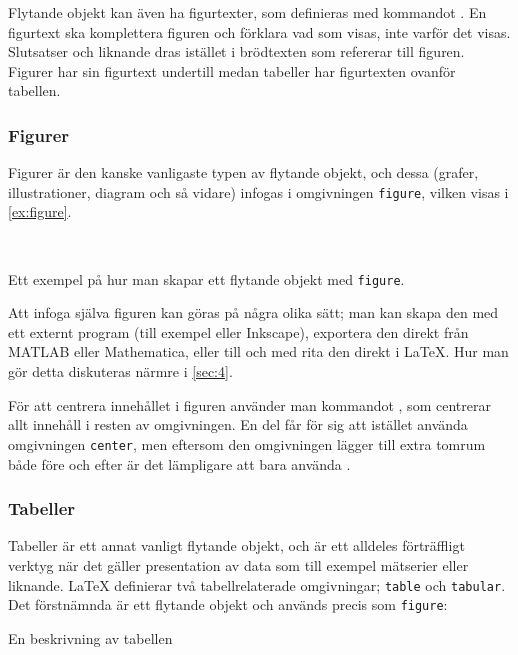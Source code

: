 \documentclass[10pt,../../a4.tex]{subfiles}
\begin{document}
Flytande objekt kan även ha figurtexter, som definieras med kommandot
. En figurtext ska komplettera figuren och förklara vad som
visas, inte varför det visas. Slutsatser och liknande dras istället i
brödtexten som refererar till figuren. Figurer har sin figurtext undertill
medan tabeller har figurtexten ovanför tabellen.

\subsubsection{Figurer}
Figurer är den kanske vanligaste typen av flytande objekt, och dessa
(grafer, illustrationer, diagram och så vidare) infogas i omgivningen
\texttt{figure}, vilken visas i \cref{ex:figure}.

\begin{kod}
	\centering\hspace{0.0075\textwidth}
	\begin{minipage}{0.75\textwidth} %
			\vfil%
			\vfil%
	\end{minipage}
	\\ \medskip
	\begin{minipage}{0.725\textwidth} %
	\end{minipage}
	\caption{Ett exempel på hur man skapar ett flytande objekt med
	\texttt{figure}.}
	\label{ex:figure}
\end{kod}

Att infoga själva figuren kan göras på några olika sätt; man kan skapa den
med ett externt program (till exempel  eller Inkscape), 
exportera den direkt från MATLAB eller Mathematica, eller till och med
rita den direkt i \LaTeX. Hur man gör detta diskuteras närmre i
\cref{sec:4}.

För att centrera innehållet i figuren använder man kommandot 
, som centrerar allt innehåll i resten av omgivningen. En
del får för sig att istället använda omgivningen \texttt{center}, men
eftersom den omgivningen lägger till extra tomrum både före och efter är
det lämpligare att bara använda .

\subsubsection{Tabeller}\label{pack:booktabs}
Tabeller är ett annat vanligt flytande objekt, och är ett alldeles
förträffligt verktyg när det gäller presentation av data som till exempel
mätserier eller liknande. \LaTeX{} definierar två tabellrelaterade
omgivningar; \texttt{table} och \texttt{tabular}. Det förstnämnda är ett
flytande objekt och används precis som \texttt{figure}:
\begin{latexcode}
\begin{table}[tpb]
\centering 
\caption{En beskrivning av tabellen}
\end{table}
\end{latexcode}
\end{document}
